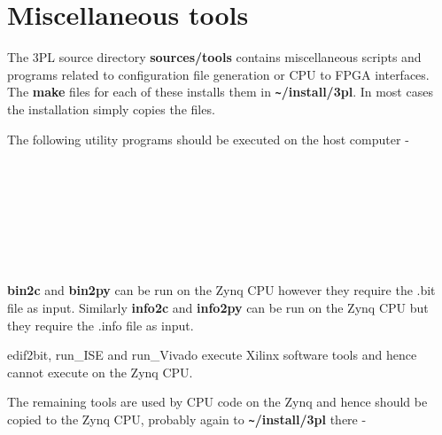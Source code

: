 \pagebreak

\chapter{Miscellaneous tools}\label{ch:misctools}

    The 3PL source directory {\bf sources/tools} contains miscellaneous
    scripts and programs related to configuration file generation or CPU to FPGA
    interfaces. The {\bf make} files for each of these installs them in 
    {\bf \verb'~'/install/3pl}. In most cases the installation simply copies the files.
    
    The following utility programs should be executed on the host computer -
    
    \hspace*{1cm}{\bf bin2c} \\
    \hspace*{1cm}{\bf bin2py} \\
    \hspace*{1cm}{\bf info2c} \\
    \hspace*{1cm}{\bf info2py} \\
    \hspace*{1cm}{\bf edif2bit} \\
    \hspace*{1cm}{\bf run\_ISE} \\
    \hspace*{1cm}{\bf run\_Vivado} \\
    
    {\bf bin2c} and {\bf bin2py} can be run on the Zynq CPU however they require
    the .bit file as input. Similarly {\bf info2c} and {\bf info2py} can be run
    on the Zynq CPU but they require the .info file as input.

    edif2bit, run\_ISE and run\_Vivado execute Xilinx software tools and hence
    cannot execute on the Zynq CPU.

    The remaining tools are used by CPU code on the Zynq and hence should be
    copied to the Zynq CPU, probably again to {\bf \verb'~'/install/3pl} there -
    
    \hspace*{1cm}{\bf cpu\_serial.c} \\
    \hspace*{1cm}{\bf cpu\_serial.h} \\
    \hspace*{1cm}{\bf cpu\_serial.py} \\
    \hspace*{1cm}{\bf fpga\_py\_extension.c} \\
    \hspace*{1cm}{\bf fpga.c} \\
    \hspace*{1cm}{\bf fpga.h} \\
    \hspace*{1cm}{\bf fpga.py} \\
    \hspace*{1cm}{\bf mk\_setup} \\
    \hspace*{1cm}{\bf setup.py} \\
            
